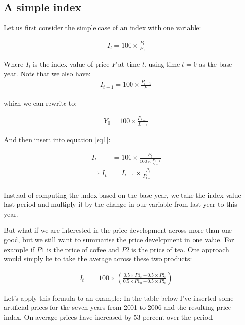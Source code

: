 \documentclass[
]{book}
\begin{document}
\hypertarget{a-simple-index}{%
\subsection*{A simple index}\label{a-simple-index}}

Let us first consider the simple case of an index with one variable:

\begin{align}
    I_t=100\times \frac{P_t}{P_0}
    \label{eq1}
\end{align}

Where \(I_t\) is the index value of price \(P\) at time \(t\), using time \(t=0\) as the base year. Note that we also have:
\begin{align}
    I_{t-1}=100\times \frac{P_{t-1}}{P_0}
    \label{eq2}
\end{align}

which we can rewrite to:

\begin{align}
    Y_0=100\times \frac{P_{t-1}}{I_{t-1}}
    \label{eq3}
\end{align}

And then insert into equation \eqref{eq1}:

\begin{align}
    I_t&=100\times \frac{P_t}{100\times \frac{P_{t-1}}{I_{t-1}}}\nonumber\\
        \Rightarrow I_t&=I_{t-1}\times \frac{P_t}{ P_{t-1}}\nonumber\\
    \label{eq4}
\end{align}

Instead of computing the index based on the base year, we take the index value last period and multiply it by the change in our variable from last year to this year.

But what if we are interested in the price development across more than one good, but we still want to summarise the price development in one value. For example if \(P1\) is the price of coffee and \(P2\) is the price of tea. One approach would simply be to take the average across these two products:

\begin{align}
   I_t&=100\times \left(\frac{0.5\times P1_t+0.5\times P2_t}{0.5\times P1_0+0.5\times P2_0}\right)
    \label{eq5}
\end{align}

Let's apply this formula to an example: In the table below I've inserted some artificial prices for the seven years from 2001 to 2006 and the resulting price index. On average prices have increased by 53 percent over the period.
\end{document}
